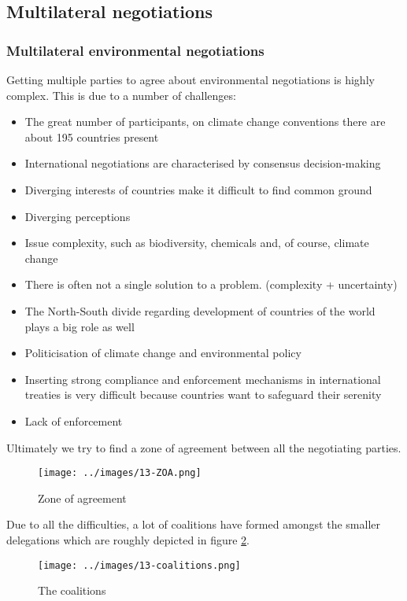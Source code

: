 \documentclass[../summary.tex]{subfiles}
\begin{document}
\subsection{Multilateral negotiations}
\subsubsection{Multilateral environmental negotiations}
Getting multiple parties to agree about environmental negotiations is highly complex. This is due to a number of challenges:
\begin{itemize}
	\setlength{\itemsep}{0pt}
	\item The great number of participants, on climate change conventions there are about 195 countries present
	\item International negotiations are characterised by consensus decision-making
	\item Diverging interests of countries make it difficult to find common ground
	\item Diverging perceptions
	\item Issue complexity, such as biodiversity, chemicals and, of course, climate change
	\item There is often not a single solution to a problem. (complexity + uncertainty)
	\item The North-South divide regarding development of countries of the world plays a big role as well
	\item Politicisation of climate change and environmental policy
	\item Inserting strong compliance and enforcement mechanisms in international treaties is very difficult because countries want to safeguard their serenity
	\item Lack of enforcement
\end{itemize}
Ultimately we try to find a zone of agreement between all the negotiating parties.
\\
\begin{figure}[h]
	\centering
	\texttt{[image: ../images/13-ZOA.png]}
	\caption{Zone of agreement}
	\label{fig:ZOA}
\end{figure}
Due to all the difficulties, a lot of coalitions have formed amongst the smaller delegations which are roughly depicted in figure \ref{fig:coalitions}.
\begin{figure}[h]
	\centering
	\texttt{[image: ../images/13-coalitions.png]}
	\caption{The coalitions}
	\label{fig:coalitions}
\end{figure}
\end{document}
